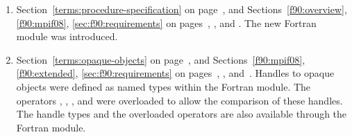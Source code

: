 \begin{enumerate}
\noindent
The following changes are related to the Fortran language support.
 
\item 
Section~\ref{terms:procedure-specification} on page~\pageref{terms:procedure-specification}, 
and Sections~\ref{f90:overview}, \ref{f90:mpif08}, \ref{sec:f90:requirements} 
on pages~\pageref{f90:overview}, \pageref{f90:mpif08}, and \pageref{sec:f90:requirements}.
\newline 
The new  Fortran module was introduced. 
 
\item 
Section~\ref{terms:opaque-objects} on page~\pageref{terms:opaque-objects}, 
and Sections~\ref{f90:mpif08}, \ref{f90:extended}, \ref{sec:f90:requirements} 
on pages~\pageref{f90:mpif08}, \pageref{f90:extended}, and~\pageref{sec:f90:requirements}.
\newline 
Handles to opaque objects were defined as named types within the  Fortran module. 
The operators , , \code{==}, and \code{/=} were overloaded to allow the comparison of these handles. 
The handle types and the overloaded operators are also available through the  Fortran module.
 
 

\end{enumerate}
